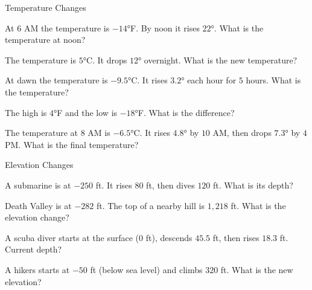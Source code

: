 \begin{practiceBox}{Temperature Changes}

\prob At $6$ AM the temperature is $-14°$F. By noon it rises $22°$. What is the temperature at noon? \answerBlank[3cm]

\prob The temperature is $5°$C. It drops $12°$ overnight. What is the new temperature? \answerBlank[3cm]

\prob At dawn the temperature is $-9.5°$C. It rises $3.2°$ each hour for $5$ hours. What is the temperature? \answerBlank[3cm]

\prob The high is $4°$F and the low is $-18°$F. What is the difference? \answerBlank[3cm]

\prob The temperature at $8$ AM is $-6.5°$C. It rises $4.8°$ by $10$ AM, then drops $7.3°$ by $4$ PM. What is the final temperature? \answerBlank[3cm]
\end{practiceBox}

\begin{practiceBox}[funTeal]{Elevation Changes}

\prob A submarine is at $-250$ ft. It rises $80$ ft, then dives $120$ ft. What is its depth? \answerBlank[3cm]

\prob Death Valley is at $-282$ ft. The top of a nearby hill is $1{,}218$ ft. What is the elevation change? \answerBlank[3cm]

\prob A scuba diver starts at the surface ($0$ ft), descends $45.5$ ft, then rises $18.3$ ft. Current depth? \answerBlank[3cm]

\prob A hikers starts at $-50$ ft (below sea level) and climbs $320$ ft. What is the new elevation? \answerBlank[3cm]
\end{practiceBox}

